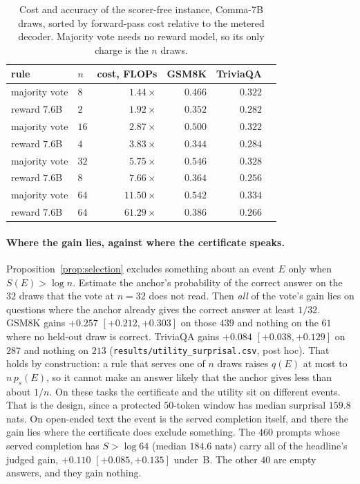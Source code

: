 \begin{table}[ht]
\centering\footnotesize
\caption{Cost and accuracy of the scorer-free instance, Comma-7B draws, sorted by forward-pass cost
relative to the metered decoder. Majority vote needs no reward model, so its only charge is the $n$
draws.}\label{tab:scorerfree}
\begin{tabular}{@{}llrrrr@{}}
\toprule
rule & $n$ & cost, FLOPs & GSM8K & TriviaQA \\
\midrule
majority vote & $8$ & $\mathbf{1.44\times}$ & $0.466$ & $0.322$ \\
reward $7.6$B & $2$ & $1.92\times$ & $0.352$ & $0.282$ \\
majority vote & $16$ & $2.87\times$ & $0.500$ & $0.322$ \\
reward $7.6$B & $4$ & $3.83\times$ & $0.344$ & $0.284$ \\
majority vote & $32$ & $\mathbf{5.75\times}$ & $\mathbf{0.546}$ & $0.328$ \\
reward $7.6$B & $8$ & $7.66\times$ & $0.364$ & $0.256$ \\
majority vote & $64$ & $11.50\times$ & $0.542$ & $0.334$ \\
reward $7.6$B & $64$ & $61.29\times$ & $0.386$ & $0.266$ \\
\bottomrule
\end{tabular}
\end{table}

\paragraph{Where the gain lies, against where the certificate speaks.}\label{app:gainwhere}
Proposition~\ref{prop:selection} excludes something about an event $E$ only when $S(E) > \log n$. Estimate
the anchor's probability of the correct answer on the $32$ draws that the vote at $n=32$ does not read. Then
\emph{all} of the vote's gain lies on questions where the anchor already gives the correct answer at least
$1/32$. GSM8K gains $+0.257$ $[+0.212, +0.303]$ on those $439$ and nothing on the $61$ where no held-out
draw is correct. TriviaQA gains $+0.084$ $[+0.038, +0.129]$ on $287$ and nothing on $213$
(\texttt{results/\allowbreak utility\_\allowbreak surprisal.csv}, post hoc). That holds by construction: a
rule that serves one of $n$ draws raises $q(E)$ at most to $n\,p_s(E)$, so it cannot make an answer likely
that the anchor gives less than about $1/n$. On these tasks the certificate and the utility sit on
different events. That is the design, since a protected $50$-token window has median surprisal $159.8$
nats. On open-ended text the event is the served completion itself, and there the gain lies where the
certificate does exclude something. The $460$ prompts whose served completion has $S > \log 64$ (median
$184.6$ nats) carry all of the headline's judged gain, $+0.110$ $[+0.085, +0.135]$ under~B. The other $40$
are empty answers, and they gain nothing.

